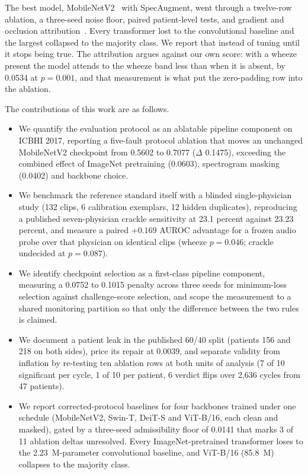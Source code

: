 \documentclass[journal,onecolumn]{IEEEtran}
\begin{document}
The best model, MobileNetV2~\cite{sandler2018mobilenetv2} with SpecAugment, went through a
twelve-row ablation, a three-seed noise floor, paired patient-level tests, and gradient and
occlusion attribution~\cite{selvaraju2017gradcam}. Every transformer lost to the convolutional
baseline and the largest collapsed to the majority class. We report that instead of tuning
until it stops being true. The attribution argues against our own score: with a wheeze present
the model attends to the wheeze band less than when it is absent, by 0.0534 at $p = 0.001$, and
that measurement is what put the zero-padding row into the ablation.

The contributions of this work are as follows.

\begin{itemize}
\item We quantify the evaluation protocol as an ablatable pipeline component on ICBHI 2017,
reporting a five-fault protocol ablation that moves an unchanged MobileNetV2 checkpoint from
0.5602 to 0.7077 ($\Delta$ 0.1475), exceeding the combined effect of ImageNet pretraining
(0.0603), spectrogram masking (0.0402) and backbone choice.

\item We benchmark the reference standard itself with a blinded single-physician study (132
clips, 6 calibration exemplars, 12 hidden duplicates), reproducing a published seven-physician
crackle sensitivity at 23.1 percent against 23.23 percent, and measure a paired $+0.169$ AUROC
advantage for a frozen audio probe over that physician on identical clips (wheeze $p = 0.046$;
crackle undecided at $p = 0.087$).

\item We identify checkpoint selection as a first-class pipeline component, measuring a 0.0752
to 0.1015 penalty across three seeds for minimum-loss selection against challenge-score
selection, and scope the measurement to a shared monitoring partition so that only the
difference between the two rules is claimed.

\item We document a patient leak in the published 60/40 split (patients 156 and 218 on both
sides), price its repair at 0.0039, and separate validity from inflation by re-testing ten
ablation rows at both units of analysis (7 of 10 significant per cycle, 1 of 10 per patient, 6
verdict flips over 2,636 cycles from 47 patients).

\item We report corrected-protocol baselines for four backbones trained under one schedule
(MobileNetV2, Swin-T, DeiT-S and ViT-B/16, each clean and masked), gated by a three-seed
admissibility floor of 0.0141 that marks 3 of 11 ablation deltas unresolved. Every
ImageNet-pretrained transformer loses to the 2.23~M-parameter convolutional baseline, and
ViT-B/16 (85.8~M) collapses to the majority class.


\end{itemize}
\end{document}
